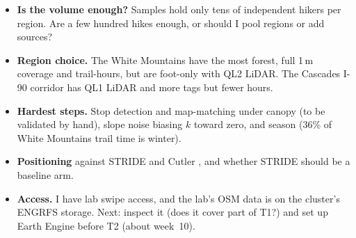 \documentclass[10pt,twocolumn,letterpaper]{article}
\begin{document}
\begin{itemize}\setlength\itemsep{1pt}
\item \textbf{Is the volume enough?} Samples hold only tens of independent hikers per region. Are a few hundred hikes enough, or should I pool regions or add sources?
\item \textbf{Region choice.} The White Mountains have the most forest, full 1\,m coverage and trail-hours, but are foot-only with QL2 LiDAR. The Cascades I-90 corridor has QL1 LiDAR and more tags but fewer hours.
\item \textbf{Hardest steps.} Stop detection and map-matching under canopy (to be validated by hand), slope noise biasing $k$ toward zero, and season (36\% of White Mountains trail time is winter).
\item \textbf{Positioning} against STRIDE and Cutler \etal, and whether STRIDE should be a baseline arm.
\item \textbf{Access.} I have lab swipe access, and the lab's OSM data is on the cluster's ENGRFS storage. Next: inspect it (does it cover part of T1?) and set up Earth Engine before T2 (about week~10).
\end{itemize}

{\footnotesize
\setlength{\itemsep}{0pt}\setlength{\parskip}{0pt}


}
\end{document}
